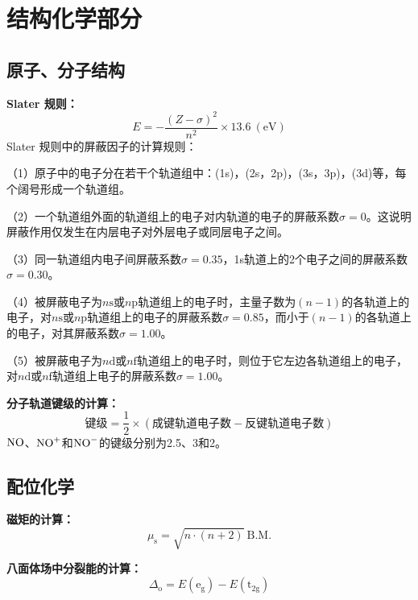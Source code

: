 \documentclass[
  10pt,
  twoside,
  openany,
  b5paper, %
  colorscheme = basic, %
  xits = false,
]{qyxf-book}
\begin{document}
\section{结构化学部分}

\subsection{原子、分子结构}

\textbf{Slater 规则：}
	\begin{equation*}
		E = - \frac{(Z-\sigma)^2}{n^2} \times 13.6 \ \mathrm{(eV)}
	\end{equation*}
Slater 规则中的屏蔽因子的计算规则：

（1）原子中的电子分在若干个轨道组中：(1s)，(2s，2p)，(3s，3p)，(3d)等，每个阔号形成一个轨道组。

（2）一个轨道组外面的轨道组上的电子对内轨道的电子的屏蔽系数$\sigma = 0$。这说明屏蔽作用仅发生在内层电子对外层电子或同层电子之间。

（3）同一轨道组内电子间屏蔽系数$\sigma=0.35$，1s轨道上的2个电子之间的屏蔽系数$\sigma=0.30$。

（4）被屏蔽电子为$n\mathrm{s}$或$n\mathrm{p}$轨道组上的电子时，主量子数为$(n-1)$的各轨道上的电子，对$n\mathrm{s}$或$n\mathrm{p}$轨道组上的电子的屏蔽系数$\sigma=0.85$，而小于$(n-1)$的各轨道上的电子，对其屏蔽系数$\sigma=1.00$。

（5）被屏蔽电子为$n\mathrm{d}$或$n\mathrm{f}$轨道组上的电子时，则位于它左边各轨道组上的电子，对$n\mathrm{d}$或$n\mathrm{f}$轨道组上电子的屏蔽系数$\sigma=1.00$。

\textbf{分子轨道键级的计算：}
	\begin{equation*}
		\text{键级} =  \frac{1}{2}\times(\text{成键轨道电子数}-\text{反键轨道电子数})
	\end{equation*}
$\ce{NO}$、$\ce{NO+}$和$\ce{NO-}$的键级分别为2.5、3和2。

\subsection{配位化学}

\textbf{磁矩的计算：}
	\begin{equation*}
		\mu_\mathrm{s} = \sqrt{n\cdot(n+2)} \ \mathrm{B.M.}
	\end{equation*}

\textbf{八面体场中分裂能的计算：}
	\begin{equation*}
		\Delta_\mathrm{o} = E(\mathrm{e_g}) - E(\mathrm{t_{2g}})
	\end{equation*}
\end{document}
